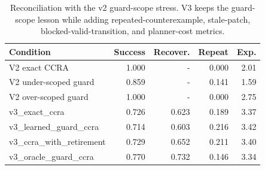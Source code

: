 \begin{table}[t]
\centering
\caption{Reconciliation with the v2 guard-scope stress. V3 keeps the guard-scope lesson while adding repeated-counterexample, stale-patch, blocked-valid-transition, and planner-cost metrics.}
\label{tab:v2-reconciliation}
\small
\begin{tabular}{lrrrr}
\toprule
Condition & Success & Recover. & Repeat & Exp. \\
\midrule
V2 exact CCRA & 1.000 & - & 0.000 & 2.01 \\
V2 under-scoped guard & 0.859 & - & 0.141 & 1.59 \\
V2 over-scoped guard & 1.000 & - & 0.000 & 2.75 \\
v3\_exact\_ccra & 0.726 & 0.623 & 0.189 & 3.37 \\
v3\_learned\_guard\_ccra & 0.714 & 0.603 & 0.216 & 3.42 \\
v3\_ccra\_with\_retirement & 0.729 & 0.652 & 0.211 & 3.40 \\
v3\_oracle\_guard\_ccra & 0.770 & 0.732 & 0.146 & 3.34 \\
\bottomrule
\end{tabular}
\end{table}
